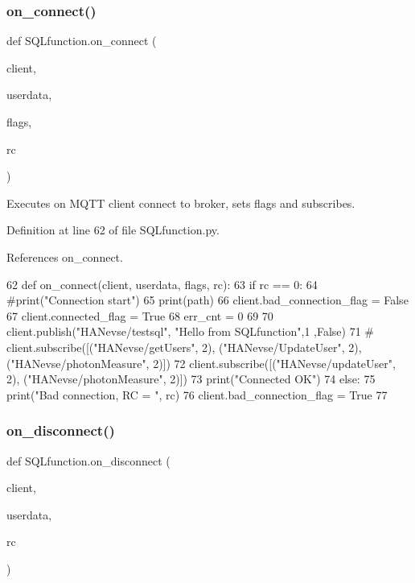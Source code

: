 \subsubsection{on\+\_\+connect()}
{\footnotesize\ttfamily def S\+Q\+Lfunction.\+on\+\_\+connect (\begin{DoxyParamCaption}\item[{}]{client,  }\item[{}]{userdata,  }\item[{}]{flags,  }\item[{}]{rc }\end{DoxyParamCaption})}



Executes on M\+Q\+TT client connect to broker, sets flags and subscribes. 



Definition at line 62 of file S\+Q\+Lfunction.\+py.



References on\+\_\+connect.


\begin{DoxyCode}
62 \textcolor{keyword}{def }on_connect(client, userdata, flags, rc):
63     \textcolor{keywordflow}{if} rc == 0:
64         \textcolor{comment}{#print("Connection start")}
65         print(path)
66         client.bad\_connection\_flag = \textcolor{keyword}{False}
67         client.connected\_flag = \textcolor{keyword}{True}        
68         err\_cnt = 0
69 
70         client.publish(\textcolor{stringliteral}{"HANevse/testsql"}, \textcolor{stringliteral}{"Hello from SQLfunction"},1 ,\textcolor{keyword}{False})
71 \textcolor{comment}{#        client.subscribe([("HANevse/getUsers", 2), ("HANevse/UpdateUser", 2), ("HANevse/photonMeasure",
       2)])}
72         client.subscribe([(\textcolor{stringliteral}{"HANevse/updateUser"}, 2), (\textcolor{stringliteral}{"HANevse/photonMeasure"}, 2)])
73         print(\textcolor{stringliteral}{"Connected OK"})
74     \textcolor{keywordflow}{else}:
75         print(\textcolor{stringliteral}{"Bad connection, RC = "}, rc)
76         client.bad\_connection\_flag = \textcolor{keyword}{True}
77 
\end{DoxyCode}
\mbox{\label{namespace_s_q_lfunction_a3a3d48b63f188d8357c3422e417a58dc}} 
\subsubsection{on\+\_\+disconnect()}
{\footnotesize\ttfamily def S\+Q\+Lfunction.\+on\+\_\+disconnect (\begin{DoxyParamCaption}\item[{}]{client,  }\item[{}]{userdata,  }\item[{}]{rc }\end{DoxyParamCaption})}



